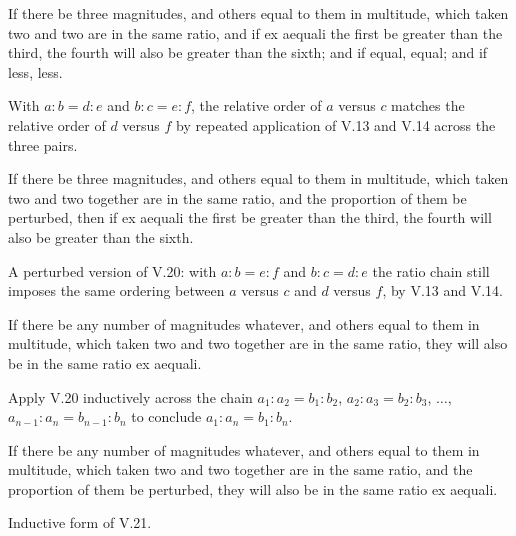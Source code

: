 \begin{claim}
\label{prop:V.20}
If there be three magnitudes, and others equal to them in multitude,
which taken two and two are in the same ratio, and if ex aequali the
first be greater than the third, the fourth will also be greater than
the sixth; and if equal, equal; and if less, less.
\end{claim}
\begin{evidence}[Proof of V.20]
\label{ev:V.20}
With $a : b = d : e$ and $b : c = e : f$, the relative order of $a$
versus $c$ matches the relative order of $d$ versus $f$ by repeated
application of V.13 and V.14 across the three pairs.
\end{evidence}

\begin{claim}
\label{prop:V.21}
If there be three magnitudes, and others equal to them in multitude,
which taken two and two together are in the same ratio, and the
proportion of them be perturbed, then if ex aequali the first be
greater than the third, the fourth will also be greater than the
sixth.
\end{claim}
\begin{evidence}[Proof of V.21]
\label{ev:V.21}
A perturbed version of V.20: with $a : b = e : f$ and $b : c = d : e$
the ratio chain still imposes the same ordering between $a$ versus
$c$ and $d$ versus $f$, by V.13 and V.14.
\end{evidence}

\begin{claim}
\label{prop:V.22}
If there be any number of magnitudes whatever, and others equal to
them in multitude, which taken two and two together are in the same
ratio, they will also be in the same ratio ex aequali.
\end{claim}
\begin{evidence}[Proof of V.22]
\label{ev:V.22}
Apply V.20 inductively across the chain $a_1 : a_2 = b_1 : b_2$, $a_2
: a_3 = b_2 : b_3$, $\dots$, $a_{n-1} : a_n = b_{n-1} : b_n$ to
conclude $a_1 : a_n = b_1 : b_n$.
\end{evidence}

\begin{claim}
\label{prop:V.23}
If there be any number of magnitudes whatever, and others equal to
them in multitude, which taken two and two together are in the same
ratio, and the proportion of them be perturbed, they will also be in
the same ratio ex aequali.
\end{claim}
\begin{evidence}[Proof of V.23]
\label{ev:V.23}
Inductive form of V.21.
\end{evidence}

